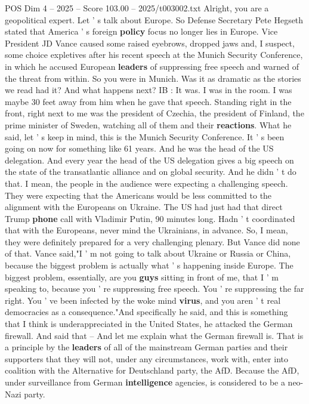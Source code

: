 \begin{textsample}{POS Dim 4 – 2025 – Score 103.00 – 2025/t003002.txt}
Alright, you are a geopolitical expert.
Let ' s talk about Europe.
So Defense Secretary Pete Hegseth stated that America ' s foreign \textbf{policy} focus no longer lies in Europe.
Vice President JD Vance caused some raised eyebrows, dropped jaws and, I suspect, some choice expletives after his recent speech at the Munich Security Conference, in which he accused European \textbf{leaders} of suppressing free speech and warned of the threat from within.
So you were in Munich.
Was it as dramatic as the stories we read had it?
And what happens next?
IB : It was.
I was in the room.
I was maybe 30 feet away from him when he gave that speech.
Standing right in the front, right next to me was the president of Czechia, the president of Finland, the prime minister of Sweden, watching all of them and their \textbf{reactions}.
What he said, let ' s keep in mind, this is the Munich Security Conference.
It ' s been going on now for something like 61 years.
And he was the head of the US delegation.
And every year the head of the US delegation gives a big speech on the state of the transatlantic alliance and on global security.
And he didn ' t do that.
I mean, the people in the audience were expecting a challenging speech.
They were expecting that the Americans would be less committed to the alignment with the Europeans on Ukraine.
The US had just had that direct Trump \textbf{phone} call with Vladimir Putin, 90 minutes long.
Hadn ' t coordinated that with the Europeans, never mind the Ukrainians, in advance.
So, I mean, they were definitely prepared for a very challenging plenary.
But Vance did none of that.
Vance said,"I ' m not going to talk about Ukraine or Russia or China, because the biggest problem is actually what ' s happening inside Europe.
The biggest problem, essentially, are you \textbf{guys} sitting in front of me, that I ' m speaking to, because you ' re suppressing free speech.
You ' re suppressing the far right.
You ' ve been infected by the woke mind \textbf{virus}, and you aren ' t real democracies as a consequence."And specifically he said, and this is something that I think is underappreciated in the United States, he attacked the German firewall.
And said that -- And let me explain what the German firewall is.
That is a principle by the \textbf{leaders} of all of the mainstream German parties and their supporters that they will not, under any circumstances, work with, enter into coalition with the Alternative for Deutschland party, the AfD.
Because the AfD, under surveillance from German \textbf{intelligence} agencies, is considered to be a neo-Nazi party.

\end{textsample}
